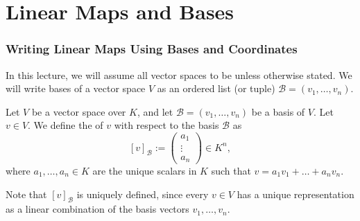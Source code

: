 \renewcommand{\thetheorem}{16.\arabic{theorem}}
\setcounter{theorem}{0}

\setcounter{chapter}{15} %


\chapter{Linear Maps and Bases}

\subsection{Writing Linear Maps Using Bases and Coordinates}


In this lecture, we will assume all vector spaces to be  unless otherwise stated. We will write bases of a vector space $V$ as an ordered list (or tuple) $\mathcal{B} = (v_1, \dots, v_n)$.

\begin{definition}
\label{def:coordinate_vector}
Let $V$ be a vector space over $K$, and let $\mathcal{B} = (v_1, \dots, v_n)$ be a basis of $V$. Let $v \in V$. We define the  of $v$ with respect to the basis $\mathcal{B}$ as
\[
[v]_{\mathcal{B}} := 
\begin{pmatrix}
a_1 \\
\vdots \\
a_n
\end{pmatrix}
\in K^n,
\]
where $a_1, \dots, a_n \in K$ are the unique scalars in $K$ such that $v = a_1 v_1 + \dots + a_n v_n$.
\end{definition}

\begin{remark}
Note that $[v]_{\mathcal{B}}$ is uniquely defined, since every $v \in V$ has a unique representation as a linear combination of the basis vectors $v_1, \dots, v_n$.
\end{remark}

